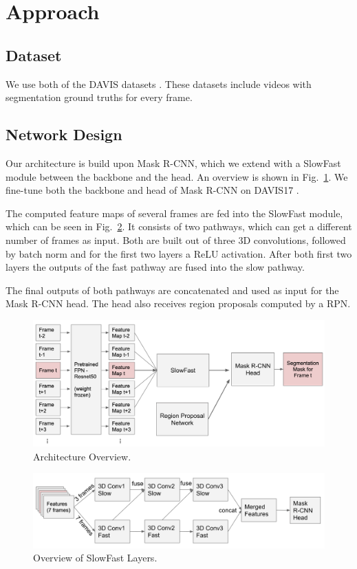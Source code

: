 \section{Approach}
\subsection{Dataset}
We use both of the DAVIS datasets \cite{davis_2016, davis_2017}. These datasets include videos with segmentation ground truths for every frame.
\subsection{Network Design}
Our architecture is build upon Mask R-CNN, which we extend with a SlowFast module between the backbone and the head. An overview is shown in  Fig.~\ref{architecture}. We fine-tune both the backbone and head of Mask R-CNN on DAVIS17 \cite{davis_2017}.

The computed feature maps of several frames are fed into the SlowFast module, which can be seen in Fig.~\ref{slowfast}. It consists of two pathways, which can get a different number of frames as input. Both are built out of three 3D convolutions, followed by batch norm and for the first two layers a ReLU activation. After both first two layers the outputs of the fast pathway are fused into the slow pathway.

The final outputs of both pathways are concatenated and used as input for the Mask R-CNN head. The head also receives region proposals computed by a RPN.

\begin{figure}
	\centering
	\includegraphics[width=\columnwidth]{figures/architecture.png}
	\caption{Architecture Overview.}
	\label{architecture}
\end{figure}

\begin{figure}
	\centering
	\includegraphics[width=\columnwidth]{figures/slowfast.png}
	\caption{Overview of SlowFast Layers.}
	\label{slowfast}
\end{figure}
